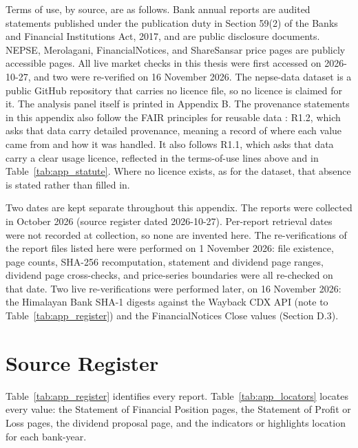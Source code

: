 Terms of use, by source, are as follows. Bank annual reports are audited statements published under the publication duty in Section 59(2) of the Banks and Financial Institutions Act, 2017, and are public disclosure documents. NEPSE, Merolagani, FinancialNotices, and ShareSansar price pages are publicly accessible pages. All live market checks in this thesis were first accessed on 2026-10-27, and two were re-verified on 16 November 2026. The nepse-data dataset is a public GitHub repository that carries no licence file, so no licence is claimed for it. The analysis panel itself is printed in Appendix B. The provenance statements in this appendix also follow the FAIR principles for reusable data \citep{wilkinson2016fair}: R1.2, which asks that data carry detailed provenance, meaning a record of where each value came from and how it was handled. It also follows R1.1, which asks that data carry a clear usage licence, reflected in the terms-of-use lines above and in Table~\ref{tab:app_statute}. Where no licence exists, as for the dataset, that absence is stated rather than filled in.

Two dates are kept separate throughout this appendix. The reports were collected in October 2026 (source register dated 2026-10-27). Per-report retrieval dates were not recorded at collection, so none are invented here. The re-verifications of the report files listed here were performed on 1 November 2026: file existence, page counts, SHA-256 recomputation, statement and dividend page ranges, dividend page cross-checks, and price-series boundaries were all re-checked on that date. Two live re-verifications were performed later, on 16 November 2026: the Himalayan Bank SHA-1 digests against the Wayback CDX API (note to Table~\ref{tab:app_register}) and the FinancialNotices Close values (Section D.3).

\section{Source Register}

Table~\ref{tab:app_register} identifies every report. Table~\ref{tab:app_locators} locates every value: the Statement of Financial Position pages, the Statement of Profit or Loss pages, the dividend proposal page, and the indicators or highlights location for each bank-year.

